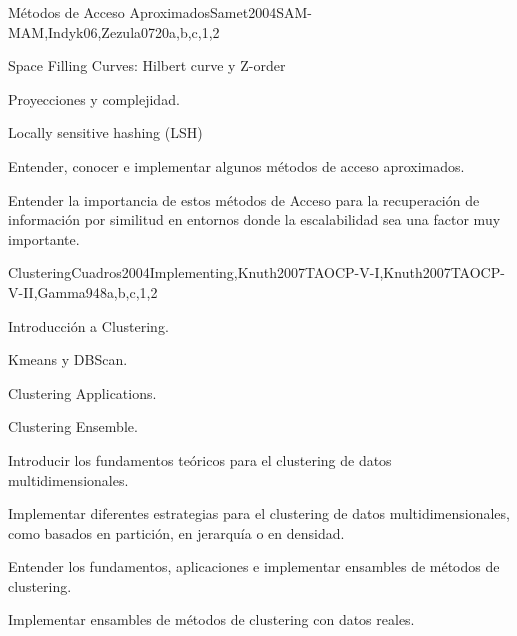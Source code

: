 \begin{syllabus}
\begin{unit}{Métodos de Acceso Aproximados}{}{Samet2004SAM-MAM,Indyk06,Zezula07}{20}{a,b,c,1,2}
   \begin{topics}
         \item Space Filling Curves: Hilbert curve y Z-order
         \item Proyecciones y complejidad.
         \item Locally sensitive hashing (LSH)
   \end{topics}
   \begin{learningoutcomes}
         \item Entender, conocer e implementar algunos métodos de acceso aproximados.
         \item Entender la importancia de estos métodos de Acceso para la recuperación de información por similitud en entornos donde la escalabilidad sea una factor muy importante.
   \end{learningoutcomes}
\end{unit}

\begin{unit}{Clustering}{}{Cuadros2004Implementing,Knuth2007TAOCP-V-I,Knuth2007TAOCP-V-II,Gamma94}{8}{a,b,c,1,2}
	\begin{topics}
         \item Introducción a Clustering.
         \item Kmeans y DBScan.
         \item Clustering Applications.
         \item Clustering Ensemble.
   \end{topics}
   \begin{learningoutcomes}
         \item Introducir los fundamentos teóricos para el clustering de datos multidimensionales.
         \item Implementar diferentes estrategias para el clustering de datos multidimensionales, como basados en partición, en jerarquía o en densidad.
         \item Entender los fundamentos, aplicaciones e implementar ensambles de métodos de clustering.
         \item Implementar ensambles de métodos de clustering con datos reales.
   \end{learningoutcomes}
\end{unit}


\end{syllabus}

